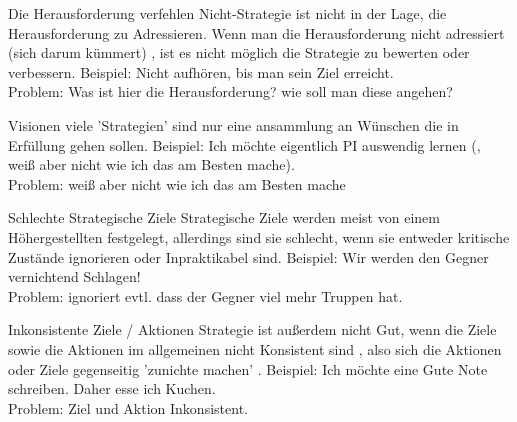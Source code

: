 \begin{frame}[c]{Die Herausforderung verfehlen}
    Nicht-Strategie ist nicht in der Lage, die Herausforderung zu Adressieren.
    Wenn man die Herausforderung nicht adressiert \iffinal (sich darum kümmert) \fi, ist es
    nicht möglich die Strategie zu bewerten oder verbessern.
    \newline
    \newline
    \pause
    Beispiel: Nicht aufhören, bis man sein Ziel erreicht. \\ \pause
    Problem: Was ist hier die Herausforderung? wie soll man diese angehen?
\end{frame}


\begin{frame}[c]{Visionen}
    viele 'Strategien' sind nur eine ansammlung an Wünschen die in Erfüllung gehen sollen.
    \newline
    \newline
    \pause
    Beispiel: Ich möchte eigentlich PI auswendig lernen (, weiß aber nicht wie ich das am Besten mache). \\ \pause
    Problem: weiß aber nicht wie ich das am Besten mache
\end{frame}


\begin{frame}[c]{Schlechte Strategische Ziele}
    Strategische Ziele werden meist von einem Höhergestellten festgelegt,
    allerdings sind sie schlecht, wenn sie entweder kritische Zustände
    ignorieren oder Inpraktikabel sind.
    \newline
    \newline
    \pause
    Beispiel: Wir werden den Gegner vernichtend Schlagen! \\ \pause
    Problem: ignoriert evtl. dass der Gegner viel mehr Truppen hat.
\end{frame}


\begin{frame}[c]{Inkonsistente Ziele / Aktionen}
    Strategie ist außerdem nicht Gut, wenn die Ziele sowie die Aktionen im allgemeinen
    nicht Konsistent sind
    \iffinal
    , also sich die Aktionen oder Ziele gegenseitig 'zunichte machen'
    \fi
    .
    \newline
    \newline
    \pause
    Beispiel: Ich möchte eine Gute Note schreiben. Daher esse ich Kuchen. \\ \pause
    Problem: Ziel und Aktion Inkonsistent.
\end{frame}



